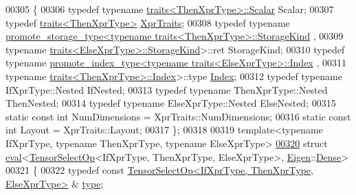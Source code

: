 \begin{DoxyCode}
00305 \{
00306   \textcolor{keyword}{typedef} \textcolor{keyword}{typename} \hyperlink{struct_eigen_1_1internal_1_1traits}{traits<ThenXprType>::Scalar} Scalar;
00307   \textcolor{keyword}{typedef} \hyperlink{struct_eigen_1_1internal_1_1traits}{traits<ThenXprType>} \hyperlink{struct_eigen_1_1internal_1_1traits}{XprTraits};
00308   \textcolor{keyword}{typedef} \textcolor{keyword}{typename} 
      \hyperlink{struct_eigen_1_1internal_1_1promote__storage__type}{promote\_storage\_type<typename traits<ThenXprType>::StorageKind}
      ,
00309                                         \textcolor{keyword}{typename} 
      \hyperlink{struct_eigen_1_1internal_1_1traits}{traits<ElseXprType>::StorageKind}>::ret StorageKind;
00310   \textcolor{keyword}{typedef} \textcolor{keyword}{typename} \hyperlink{struct_eigen_1_1internal_1_1promote__index__type}{promote\_index\_type<typename traits<ElseXprType>::Index}
      ,
00311                                       \textcolor{keyword}{typename} \hyperlink{struct_eigen_1_1internal_1_1traits}{traits<ThenXprType>::Index}>::type 
      \hyperlink{namespace_eigen_a62e77e0933482dafde8fe197d9a2cfde}{Index};
00312   \textcolor{keyword}{typedef} \textcolor{keyword}{typename} IfXprType::Nested IfNested;
00313   \textcolor{keyword}{typedef} \textcolor{keyword}{typename} ThenXprType::Nested ThenNested;
00314   \textcolor{keyword}{typedef} \textcolor{keyword}{typename} ElseXprType::Nested ElseNested;
00315   \textcolor{keyword}{static} \textcolor{keyword}{const} \textcolor{keywordtype}{int} NumDimensions = XprTraits::NumDimensions;
00316   \textcolor{keyword}{static} \textcolor{keyword}{const} \textcolor{keywordtype}{int} Layout = XprTraits::Layout;
00317 \};
00318 
00319 \textcolor{keyword}{template}<\textcolor{keyword}{typename} IfXprType, \textcolor{keyword}{typename} ThenXprType, \textcolor{keyword}{typename} ElseXprType>
\hyperlink{struct_eigen_1_1internal_1_1eval_3_01_tensor_select_op_3_01_if_xpr_type_00_01_then_xpr_type_00_0a870a7ff2702168df3e9b7b8d1181076}{00320} \textcolor{keyword}{struct }\hyperlink{struct_eigen_1_1internal_1_1eval}{eval}<\hyperlink{class_eigen_1_1_tensor_select_op}{TensorSelectOp}<IfXprType, ThenXprType, ElseXprType>, 
      \hyperlink{namespace_eigen}{Eigen}::\hyperlink{struct_eigen_1_1_dense}{Dense}>
00321 \{
00322   \textcolor{keyword}{typedef} \textcolor{keyword}{const} \hyperlink{class_eigen_1_1_tensor_select_op}{TensorSelectOp<IfXprType, ThenXprType, ElseXprType>}
      & \hyperlink{class_eigen_1_1_tensor_select_op}{type};

\end{DoxyCode}
